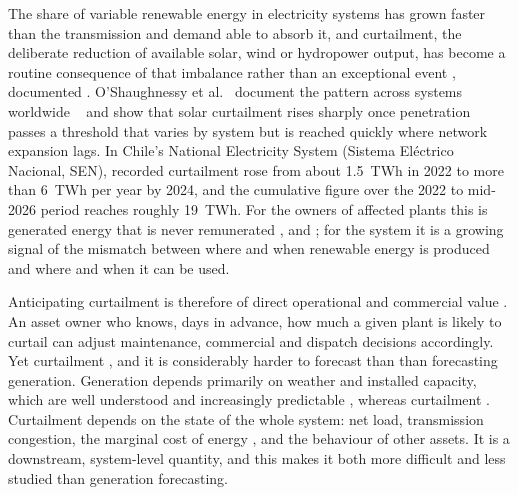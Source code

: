 \documentclass[preprint,3p,times]{elsarticle}
\providecommand{\DIFaddtex}[1]{{\protect\color{blue} \sf #1}} %
\providecommand{\DIFdeltex}[1]{{\protect\color{red} \scriptsize #1}} %
\providecommand{\DIFaddbegin}{} %
\providecommand{\DIFaddend}{} %
\providecommand{\DIFdelbegin}{} %
\providecommand{\DIFdelend}{} %
\providecommand{\DIFadd}[1]{\texorpdfstring{\DIFaddtex{#1}}{#1}} %
\providecommand{\DIFdel}[1]{\texorpdfstring{\DIFdeltex{#1}}{}} %
\begin{document}
The share of variable renewable energy \DIFdelbegin \DIFdel{in electricity systems }\DIFdelend has grown faster than the transmission and demand able to absorb it, and curtailment, the deliberate reduction of available solar, wind or hydropower output, has become a routine consequence of that imbalance rather than an exceptional event\DIFdelbegin \DIFdel{, documented }\DIFdelend \DIFaddbegin \DIFadd{. O'Shaughnessy et al.~\cite{oshaughnessy2020} document the pattern }\DIFaddend across systems worldwide \DIFdelbegin \DIFdel{~\cite{oshaughnessy2020}}\DIFdelend \DIFaddbegin \DIFadd{and show that solar curtailment rises sharply once penetration passes a threshold that varies by system but is reached quickly where network expansion lags}\DIFaddend . In Chile's National Electricity System (Sistema El\'ectrico Nacional, SEN), recorded curtailment rose from about 1.5~TWh in 2022 to more than 6~TWh per year by 2024, and the cumulative figure over \DIFdelbegin \DIFdel{the }\DIFdelend 2022 to mid-2026 \DIFdelbegin \DIFdel{period }\DIFdelend reaches roughly 19~TWh. For the owners of affected plants this is generated energy that is never remunerated\DIFdelbegin \DIFdel{, and }\DIFdelend \DIFaddbegin \DIFadd{; }\DIFaddend for the system it is a growing signal of the mismatch between where and when renewable energy is produced and where and when it can be used.

Anticipating curtailment is therefore of direct operational and commercial value\DIFdelbegin \DIFdel{. An asset owner who knows, days in advance, how much a given plant is likely to curtail can adjust maintenance, commercial and dispatch decisions accordingly. Yet curtailment }\DIFdelend \DIFaddbegin \DIFadd{, and it }\DIFaddend is considerably harder \DIFdelbegin \DIFdel{to forecast than }\DIFdelend \DIFaddbegin \DIFadd{than forecasting }\DIFaddend generation. Generation depends primarily on weather and installed capacity, which are well understood and increasingly predictable\DIFdelbegin \DIFdel{, whereas curtailment }\DIFdelend \DIFaddbegin \DIFadd{. Curtailment }\DIFaddend depends on the state of the whole system: net load, transmission congestion, the marginal cost of energy \DIFdelbegin \DIFdel{, }\DIFdelend and the behaviour of other assets. It is a downstream, system-level quantity, and this makes it both more difficult and less studied than generation forecasting.
\end{document}
